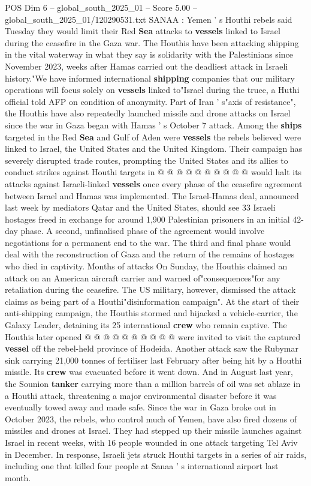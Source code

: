 \begin{textsample}{POS Dim 6 – global\_south\_2025\_01 – Score 5.00 – global\_south\_2025\_01/120290531.txt}  \label{ex:f6_pos_439}
SANAA : Yemen ' s Houthi rebels said Tuesday they would limit their Red \textbf{Sea} attacks to \textbf{vessels} linked to Israel during the ceasefire in the Gaza war.
The Houthis have been attacking shipping in the vital waterway in what they say is solidarity with the Palestinians since November 2023, weeks after Hamas carried out the deadliest attack in Israeli history."We have informed international \textbf{shipping} companies that our military operations will focus solely on \textbf{vessels} linked to"Israel during the truce, a Huthi official told AFP on condition of anonymity.
Part of Iran ' s"axis of resistance", the Houthis have also repeatedly launched missile and drone attacks on Israel since the war in Gaza began with Hamas ' s October 7 attack.
Among the \textbf{ships} targeted in the Red \textbf{Sea} and Gulf of Aden were \textbf{vessels} the rebels believed were linked to Israel, the United States and the United Kingdom.
Their campaign has severely disrupted trade routes, prompting the United States and its allies to conduct strikes against Houthi targets in @ @ @ @ @ @ @ @ @ @ would halt its attacks against Israeli-linked \textbf{vessels} once every phase of the ceasefire agreement between Israel and Hamas was implemented.
The Israel-Hamas deal, announced last week by mediators Qatar and the United States, should see 33 Israeli hostages freed in exchange for around 1,900 Palestinian prisoners in an initial 42-day phase.
A second, unfinalised phase of the agreement would involve negotiations for a permanent end to the war.
The third and final phase would deal with the reconstruction of Gaza and the return of the remains of hostages who died in captivity.
Months of attacks On Sunday, the Houthis claimed an attack on an American aircraft carrier and warned of"consequences"for any retaliation during the ceasefire.
The US military, however, dismissed the attack claims as being part of a Houthi"disinformation campaign".
At the start of their anti-shipping campaign, the Houthis stormed and hijacked a vehicle-carrier, the Galaxy Leader, detaining its 25 international \textbf{crew} who remain captive.
The Houthis later opened @ @ @ @ @ @ @ @ @ @ were invited to visit the captured \textbf{vessel} off the rebel-held province of Hodeida.
Another attack saw the Rubymar sink carrying 21,000 tonnes of fertiliser last February after being hit by a Houthi missile.
Its \textbf{crew} was evacuated before it went down.
And in August last year, the Sounion \textbf{tanker} carrying more than a million barrels of oil was set ablaze in a Houthi attack, threatening a major environmental disaster before it was eventually towed away and made safe.
Since the war in Gaza broke out in October 2023, the rebels, who control much of Yemen, have also fired dozens of missiles and drones at Israel.
They had stepped up their missile launches against Israel in recent weeks, with 16 people wounded in one attack targeting Tel Aviv in December.
In response, Israeli jets struck Houthi targets in a series of air raids, including one that killed four people at Sanaa ' s international airport last month.

\end{textsample}
